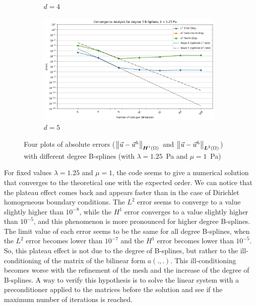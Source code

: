 \documentclass[a4paper,12pt,twoside]{report}
\begin{document}
\begin{figure}[!h]
\begin{subfigure}[b]{0.49\textwidth}
		\caption{$d=4$}
		\label{fig:deg4_NM}
	\end{subfigure}
	\begin{subfigure}[b]{0.49\textwidth}
		\centering
		\includegraphics[width=\textwidth]{figures/figures_non_mixed/convergence_plot_degree_5_lambda=1.25.png}
		\caption{$d=5$}
		\label{fig:deg5_NM}
	\end{subfigure}
	\caption{Four plots of absolute errors ($\norm{\vec u - \vec u^h}_{\boldsymbol H^1(\Omega)}$ and $\norm{\vec u - \vec u^h}_{\boldsymbol L^2(\Omega)}$) with different degree B-splines (with $\lambda = 1.25$~Pa and $\mu = 1$~Pa)}
	\label{fig:four_errors_graphs}
\end{figure}

For fixed values $\lambda = 1.25$ and $\mu = 1$, the code seems to give a numerical solution that converges to the theoretical one with the expected order. We can notice that the plateau effect comes back and appears faster than in the case of Dirichlet homogeneous boundary conditions. The $L^2$ error seems to converge to a value slightly higher than $10^{-8}$, while the $H^1$ error converges to a value slightly higher than $10^{-5}$, and this phenomenon is more pronounced for higher degree B-splines. The limit value of each error seems to be the same for all degree B-splines, when the $L^2$ error becomes lower than $10^{-7}$ and the $H^1$ error becomes lower than $10^{-5}$. So, this plateau effect is not due to the degree of B-splines, but rather to the ill-conditioning of the matrix of the bilinear form $a(.,.)$. This ill-conditioning becomes worse with the refinement of the mesh and the increase of the degree of B-splines. A way to verify this hypothesis is to solve the linear system with a preconditioner applied to the matrices before the solution and see if the maximum number of iterations is reached.
\end{document}
